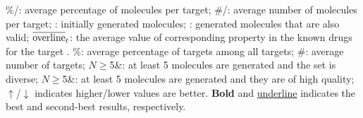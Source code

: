 \begin{table*}[!t]
\begin{footnotesize}
\begin{threeparttable}
\begin{tabular}
	
      \bottomrule
      \end{tabular}
      \begin{tablenotes}
	\begin{scriptsize}
	\setlength{}
    	\item 
	\%\molecule/\target: average percentage of molecules per target; 
	\#\molecule/\target: average number of molecules per target; 
	\ANGMPT: initially generated molecules; 
	\ANGVMPT: generated molecules that are also valid; 
	$\overline{\text{overline}}_{\scriptsize{\mbox{$\mathop{t}\limits$}}}$: the average value of corresponding property in the known drugs for 
	the target \target. 
	\%\target: average percentage of targets among all targets; 
	\#\target: average number of targets; 
	$N$$\!\ge\!$5\&\diversityreq: at least 5 molecules are generated and the set is diverse;  
	$N$$\!\ge\!$5\&\HQ: at least 5 molecules are generated and they are of high quality; 
	$\uparrow$/$\downarrow$ indicates higher/lower values are better. 
    \textbf{Bold} and \underline{underline} indicates the best and second-best results, respectively.
    \par
	\end{scriptsize}
  \end{tablenotes}
  \end{threeparttable}
  \end{footnotesize}      
  \vskip -15pt
\end{table*}
